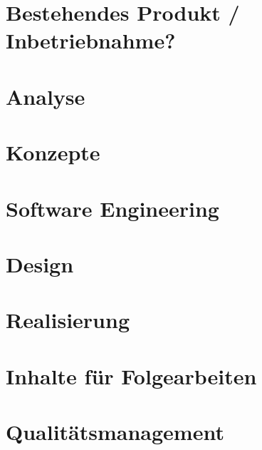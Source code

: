 \documentclass[12pt, a4paper]{report}
\begin{document}
	\chapter{Bestehendes Produkt / Inbetriebnahme?}
	
	
	\chapter{Analyse}
	
		
	\chapter{Konzepte}
		
	
	
	\chapter{Software Engineering}
		
	
	\chapter{Design}
	
	
	
	
	\chapter{Realisierung}
	

	
	\chapter{Inhalte für Folgearbeiten}
	
	
	
	\chapter{Qualitätsmanagement}
	
	
\end{document}

